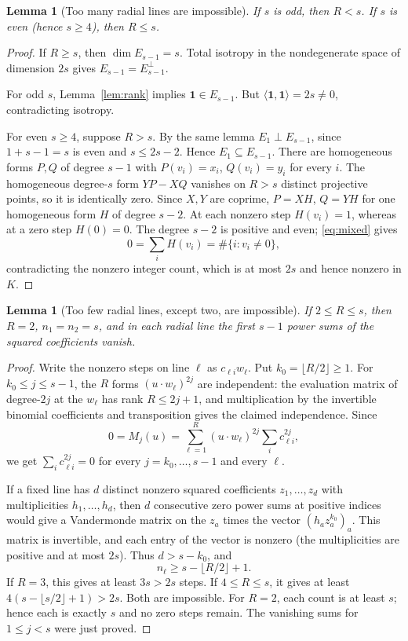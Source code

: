 \documentclass[11pt]{article}
\newtheorem{lemma}[theorem]{Lemma}
\theoremstyle{remark}\newtheorem{remark}[theorem]{Remark}
\begin{document}
\begin{lemma}[Too many radial lines are impossible]\label{lem:many}
If $s$ is odd, then $R<s$. If $s$ is even (hence $s\ge4$), then $R\le s$.
\end{lemma}
\begin{proof}
If $R\ge s$, then $\dim E_{s-1}=s$. Total isotropy in the nondegenerate space of dimension $2s$ gives $E_{s-1}=E_{s-1}^\perp$.

For odd $s$, Lemma~\ref{lem:rank} implies $\mathbf1\in E_{s-1}$. But $\langle\mathbf1,\mathbf1\rangle=2s\ne0$, contradicting isotropy.

For even $s\ge4$, suppose $R>s$. By the same lemma $E_1\perp E_{s-1}$, since $1+s-1=s$ is even and $s\le2s-2$. Hence $E_1\subseteq E_{s-1}$. There are homogeneous forms $P,Q$ of degree $s-1$ with $P(v_i)=x_i$, $Q(v_i)=y_i$ for every $i$. The homogeneous degree-$s$ form $YP-XQ$ vanishes on $R>s$ distinct projective points, so it is identically zero. Since $X,Y$ are coprime, $P=XH$, $Q=YH$ for one homogeneous form $H$ of degree $s-2$. At each nonzero step $H(v_i)=1$, whereas at a zero step $H(0)=0$. The degree $s-2$ is positive and even; \eqref{eq:mixed} gives
\[
 0=\sum_i H(v_i)=\#\{i:v_i\ne0\},
\]
contradicting the nonzero integer count, which is at most $2s$ and hence nonzero in $K$.
\end{proof}

\begin{lemma}[Too few radial lines, except two, are impossible]\label{lem:few}
If $2\le R\le s$, then $R=2$, $n_1=n_2=s$, and in each radial line the first $s-1$ power sums of the squared coefficients vanish.
\end{lemma}
\begin{proof}
Write the nonzero steps on line $\ell$ as $c_{\ell i} w_\ell$. Put $k_0=\lfloor R/2\rfloor\ge1$. For $k_0\le j\le s-1$, the $R$ forms $(u\cdot w_\ell)^{2j}$ are independent: the evaluation matrix of degree-$2j$ at the $w_\ell$ has rank $R\le2j+1$, and multiplication by the invertible binomial coefficients and transposition gives the claimed independence. Since
\[
 0=M_j(u)=\sum_{\ell=1}^R (u\cdot w_\ell)^{2j}\sum_i c_{\ell i}^{2j},
\]
we get $\sum_i c_{\ell i}^{2j}=0$ for every $j=k_0,\ldots,s-1$ and every $\ell$.

If a fixed line has $d$ distinct nonzero squared coefficients $z_1,\ldots,z_d$ with multiplicities $h_1,\ldots,h_d$, then $d$ consecutive zero power sums at positive indices would give a Vandermonde matrix on the $z_a$ times the vector $(h_a z_a^{k_0})_a$. This matrix is invertible, and each entry of the vector is nonzero (the multiplicities are positive and at most $2s$). Thus $d>s-k_0$, and
\begin{equation}\label{eq:radialcount}
 n_\ell\ge s-\lfloor R/2\rfloor+1.
\end{equation}
If $R=3$, this gives at least $3s>2s$ steps. If $4\le R\le s$, it gives at least $4(s-\lfloor s/2\rfloor+1)>2s$. Both are impossible. For $R=2$, each count is at least $s$; hence each is exactly $s$ and no zero steps remain. The vanishing sums for $1\le j<s$ were just proved.
\end{proof}
\end{document}
